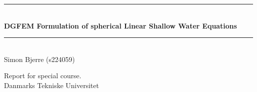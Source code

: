 \begin{titlepage}
\centering
\rule{\textwidth}{1mm}\\
\vspace{1cm}
\Huge\bfseries DGFEM Formulation of spherical Linear Shallow Water Equations\\
\vspace{0.7cm}
\rule{\textwidth}{1mm}\\
\vspace{3cm}
\large
Simon Bjerre (s224059) \\
\vspace{1.7cm}

\normalsize
\begin{flushleft}
Report for special course.\\
Danmarks Tekniske Universitet\\

\end{flushleft}
\end{titlepage}